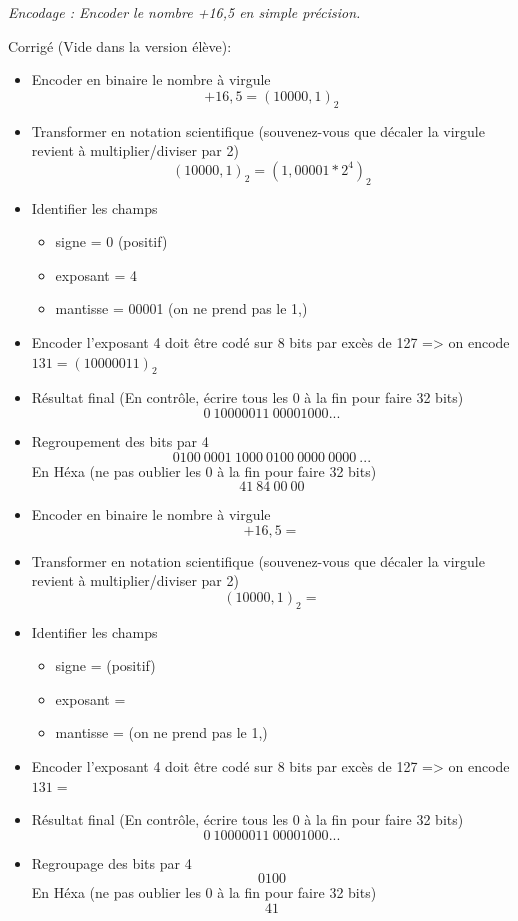 \documentclass[10pt,fleqn]{article} %
\begin{document}
\begin{exercice}
\textit{Encodage : Encoder le nombre +16,5 en simple précision.}

\ifprof
Corrigé (Vide dans la version élève):
\begin{itemize}
\item Encoder en binaire le nombre à virgule 
$$+16,5 = (10000,1)_2$$
\item Transformer en notation scientifique (souvenez-vous que décaler la virgule revient à 
multiplier/diviser par 2)
$$(10000,1)_2 = (1,00001*2^4
)_2$$
\item Identifier les champs
\begin{itemize}
\item signe = 0 (positif)
\item exposant = 4
\item mantisse = 00001 (on ne prend pas le 1,)
\end{itemize}
\item Encoder l’exposant
4 doit être codé sur 8 bits par excès de 127 => on encode $131 = (1000 0011)_2$

\item Résultat final (En contrôle, écrire tous les 0 à la fin pour faire 32 bits) 
$$0\ 10000011\ 00001000...$$
\item Regroupement des bits par 4
$$0100\ 0001\ 1000\ 0100\ 0000\ 0000\ ...$$
En Héxa (ne pas oublier les 0 à la fin pour faire 32 bits)
$$41\ 84\ 00\ 00$$
\end{itemize}
\else
\begin{itemize}
\item Encoder en binaire le nombre à virgule 
$$+16,5 = $$
\item Transformer en notation scientifique (souvenez-vous que décaler la virgule revient à 
multiplier/diviser par 2)
$$(10000,1)_2 = $$
\item Identifier les champs
\begin{itemize}
\item signe =   (positif)
\item exposant =  
\item mantisse =           (on ne prend pas le 1,)
\end{itemize}
\item Encoder l’exposant
4 doit être codé sur 8 bits par excès de 127 => on encode $131 =  $

\item Résultat final (En contrôle, écrire tous les 0 à la fin pour faire 32 bits) 
$$0 \ 10000011\ 00001000...$$
\item Regroupage des bits par 4
$$0100                $$
En Héxa (ne pas oublier les 0 à la fin pour faire 32 bits)
$$41  $$
\end{itemize}
\fi
\end{exercice}
\end{document}
